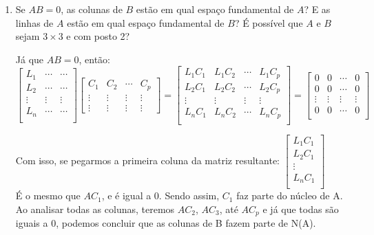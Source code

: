 \documentclass[leqno]{article}
\begin{document}
	\maketitle
	
	\begin{enumerate}
		
		\item Se $AB = 0$, as colunas de $B$ estão em qual espaço fundamental de $A$? E as linhas de $A$ estão em qual espaço fundamental de $B$? É possível que $A$ e $B$ sejam $3 \times 3$ e com posto 2?
		
		\begin{sol} 
			Já que $AB = 0$, então:\\
			$$\begin{bmatrix}
				L_1 & \cdots & \cdots \\
				L_2 & \cdots & \cdots \\
				\vdots & \vdots & \vdots \\
				L_n & \cdots & \cdots \\
			\end{bmatrix}\begin{bmatrix}
				C_1 & C_2 & \cdots & C_p \\
				\vdots & \vdots & \vdots & \vdots \\
				\vdots & \vdots & \vdots & \vdots
			\end{bmatrix} = \begin{bmatrix}
			L_1C_1 & L_1C_2 & \cdots & L_1C_p \\
			L_2C_1 & L_2C_2 & \cdots & L_2C_p \\
			\vdots & \vdots & \vdots & \vdots \\
			L_nC_1 & L_nC_2 & \cdots & L_nC_p \\
		\end{bmatrix}= \begin{bmatrix}
		0 & 0 & \cdots & 0 \\
		0 & 0 & \cdots & 0 \\
		\vdots & \vdots & \vdots & \vdots \\
		0 & 0 & \cdots & 0 \\
		\end{bmatrix}$$
	
		Com isso, se pegarmos a primeira coluna da matriz resultante:
		$\begin{bmatrix}
			L_1C_1 \\
			L_2C_1 \\
			\vdots \\
			L_nC_1 \\
		\end{bmatrix}$\\
		É o mesmo que $A C_1$, e é igual a 0. Sendo assim, $C_1$ faz parte do núcleo de A. Ao analisar todas as colunas, teremos $A C_2$, $A C_3$, até $A C_p$ e já que todas são iguais a 0, podemos concluir que as colunas de B fazem parte de N(A).
		

\end{sol}
\end{enumerate}
\end{document}
